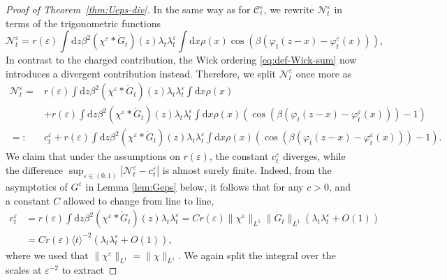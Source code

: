 \documentclass[11pt, a4paper]{scrartcl}
\numberwithin{equation}{section}
\theoremstyle{plain}
\theoremstyle{remark}
\newcommand{\backassign}{=:}
\newcommand{\mathd}{\mathrm{d}}
\newcommand{\tmtextbf}[1]{\text{{\bfseries{#1}}}}
\begin{document}
\begin{proof}[Proof of Theorem~\ref{thm:Ueps-div}]
  \tmtextbf{($\mathcal{N}^{\varepsilon}_t$).} In the same way as for
  $\mathcal{C}^{\varepsilon}_t$, we rewrite $\mathcal{N}^{\varepsilon}_t$ in
  terms of the trigonometric functions
  \[ \mathcal{N}^{\varepsilon}_t = r (\varepsilon) \int \mathd z \beta^2
     (\chi^{\varepsilon} \ast \dot{G}_t ) (z) \lambda_t
     \lambda_t^{\varepsilon} \int \mathd x \rho (x) \cos (\beta (\varphi_t (z
     - x) - \varphi_t^{\varepsilon} (x))), \]
  In contrast to the charged contribution, the Wick ordering
  \eqref{eq:def-Wick-sum} now introduces a divergent contribution instead.
  Therefore, we split $\mathcal{N}^{\varepsilon}_t$ once more as
  \[ \begin{aligned}
       \mathcal{N}^{\varepsilon}_t = & r (\varepsilon) \int \mathd z \beta^2
       (\chi^{\varepsilon} \ast \dot{G}_t ) (z) \lambda_t
       \lambda_t^{\varepsilon}  \int \mathd x \rho (x)\\
       & + r (\varepsilon) \int \mathd z \beta^2 (\chi^{\varepsilon} \ast
       \dot{G}_t ) (z) \lambda_t \lambda_t^{\varepsilon} \int \mathd x \rho
       (x) (\cos (\beta (\varphi_t (z - x) - \varphi_t^{\varepsilon} (x))) -
       1)\\
       \backassign & c^{\varepsilon}_t + r (\varepsilon) \int \mathd z
       \beta^2 (\chi^{\varepsilon} \ast \dot{G}_t ) (z) \lambda_t
       \lambda_t^{\varepsilon} \int \mathd x \rho (x) (\cos (\beta (\varphi_t
       (z - x) - \varphi_t^{\varepsilon} (x))) - 1) .
     \end{aligned} \]
  We claim that under the assumptions on $r (\varepsilon)$, the constant
  $c^{\varepsilon}_t$ diverges, while the difference $\sup_{\varepsilon \in (0, 1)} |
  \mathcal{N}^{\varepsilon}_t - c_t^{\varepsilon} |$ is almost surely finite.
  Indeed, from the asymptotics of $G^{\varepsilon}$ in Lemma \ref{lem:Geps}
  below, it follows that for any $c > 0$, and a constant $C$ allowed to change
  from line to line,
  \[ \begin{aligned}
       c_t^{\varepsilon} &= r (\varepsilon) \int \mathd z \beta^2
       (\chi^{\varepsilon} \ast \dot{G}_t ) (z) \lambda_t
       \lambda_t^{\varepsilon} = Cr (\varepsilon) \| \chi^{\varepsilon}
       \|_{L^1} \| \dot{G}_t \|_{L^1}  (\lambda_t \lambda_t^{\varepsilon} + O
       (1))\\
       &= Cr (\varepsilon) \langle t \rangle^{- 2}  (\lambda_t
       \lambda_t^{\varepsilon} + O (1)),
     \end{aligned} \]
  where we used that $\| \chi^{\varepsilon} \|_{L^1} = \| \chi \|_{L^1}$. We
  again split the integral over the scales at $\varepsilon^{- 2}$ to extract

\end{proof}
\end{document}
